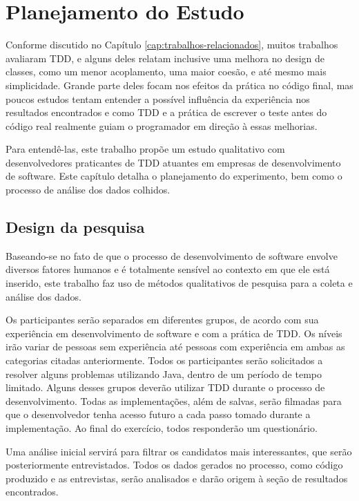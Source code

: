 \chapter{Planejamento do Estudo}
\label{cap:planejamento}

Conforme discutido no Capítulo \ref{cap:trabalhos-relacionados}, muitos 
trabalhos avaliaram TDD, e alguns deles relatam inclusive uma melhora
no design de classes, como um menor acoplamento, uma maior coesão, e até mesmo
mais simplicidade. 
Grande parte deles focam nos efeitos da prática
no código final, mas poucos estudos tentam entender a possível influência da experiência
nos resultados encontrados e como TDD e a
prática de escrever o teste antes do código real realmente guiam o programador 
em direção à essas melhorias.

Para entendê-las, este trabalho propõe um estudo qualitativo com 
desenvolvedores praticantes de TDD atuantes em empresas de desenvolvimento de
software. Este capítulo detalha o planejamento do experimento, 
bem como o processo de análise dos dados colhidos.

\section{Design da pesquisa}

Baseando-se no fato de que o processo de desenvolvimento de software envolve 
diversos fatores humanos e é totalmente sensível ao contexto em que ele está 
inserido, este trabalho faz uso de métodos qualitativos de pesquisa para a coleta e 
análise dos dados.

Os participantes serão separados em diferentes grupos, de acordo com sua
experiência em desenvolvimento de software e com a prática de TDD. Os níveis
irão variar de pessoas sem experiência até pessoas com experiência em ambas
as categorias citadas anteriormente.
Todos os participantes serão
solicitados a resolver alguns problemas utilizando Java, dentro de um
período de tempo limitado. Alguns desses grupos deverão
utilizar TDD durante o processo de desenvolvimento. Todas as implementações,
além de salvas, serão filmadas para que o desenvolvedor tenha acesso futuro
a cada passo tomado durante a implementação.
Ao final do exercício,
todos responderão um questionário.

Uma análise inicial servirá para filtrar os candidatos
mais interessantes, que serão posteriormente entrevistados. 
Todos os dados gerados no processo,
como código produzido e as entrevistas, serão analisados e darão origem
à seção de resultados encontrados.

